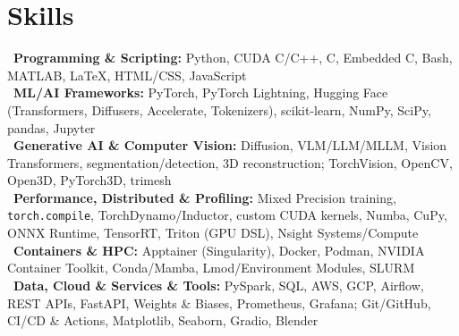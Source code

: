 
\section*{Skills}
\textbullet~\textbf{Programming \& Scripting:} Python, CUDA C/C++, C, Embedded C, Bash, MATLAB, \LaTeX, HTML/CSS, JavaScript\\
\textbullet~\textbf{ML/AI Frameworks:} PyTorch, PyTorch Lightning, Hugging Face (Transformers, Diffusers, Accelerate, Tokenizers), scikit-learn, NumPy, SciPy, pandas, Jupyter\\
\textbullet~\textbf{Generative AI \& Computer Vision:} Diffusion, VLM/LLM/MLLM, Vision Transformers, segmentation/detection, 3D reconstruction; TorchVision, OpenCV, Open3D, PyTorch3D, trimesh\\
\textbullet~\textbf{Performance, Distributed \& Profiling:} Mixed Precision training, \texttt{torch.compile}, TorchDynamo/Inductor, custom CUDA kernels, Numba, CuPy, ONNX Runtime, TensorRT, Triton (GPU DSL), Nsight Systems/Compute\\
\textbullet~\textbf{Containers \& HPC:} Apptainer (Singularity), Docker, Podman, NVIDIA Container Toolkit, Conda/Mamba, Lmod/Environment Modules, SLURM\\
\textbullet~\textbf{Data, Cloud \& Services \& Tools:} PySpark, SQL, AWS, GCP, Airflow, REST APIs, FastAPI, Weights \& Biases, Prometheus, Grafana; Git/GitHub, CI/CD \& Actions, Matplotlib, Seaborn, Gradio, Blender
